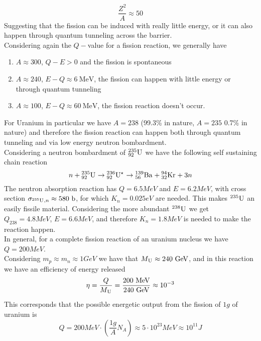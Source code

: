 \documentclass[../qm.tex]{subfiles}
\begin{document}
\begin{equation*}
	\frac{Z^2}{A}\approx50
\end{equation*}
Suggesting that the fission can be induced with really little energy, or it can also happen through quantum tunneling across the barrier.\\
Considering again the $Q-$value for a fission reaction, we generally have
\begin{enumerate}
\item $A\approx300$, $Q-E>0$ and the fission is spontaneous
\item $A\approx240$, $E-Q\approx 6\ \mathrm{MeV}$, the fission can happen with little energy or through quantum tunneling
\item $A\approx100$, $E-Q\approx60\ \mathrm{MeV}$, the fission reaction doesn't occur.
\end{enumerate}
For Uranium in particular we have $A=238$ (99.3\% in nature, $A=235$ 0.7\% in nature) and therefore the fission reaction can happen both through quantum tunneling and via low energy neutron bombardment.\\
Considering a neutron bombardment of $\nuc{U}{235}{92}$ we have the following self sustaining chain reaction
\begin{equation*}
	n+\nuc{U}{235}{92}\to\nuc{U^\star}{236}{92}\to\nuc{Ba}{139}{56}+\nuc{Kr}{94}{32}+3n
\end{equation*}
The neutron absorption reaction has $Q=6.5\unit{MeV}$ and $E=6.2\unit{MeV}$, with cross section $\sigma_{\nuc{U}{235}{},n}\approx580\unit{b}$, for which $K_n=0.025\unit{eV}$ are needed. This makes $\nuc{U}{235}{}$ an easily fissile material. Considering the more abundant $\nuc{U}{238}{}$ we get $Q_{238}=4.8\unit{MeV}$, $E=6.6\unit{MeV}$, and therefore $K_n=1.8\unit{MeV}$ is needed to make the reaction happen.\\
In general, for a complete fission reaction of an uranium nucleus we have $Q=200\unit{MeV}$.\\
Considering $m_p\approx m_n\approx1\unit{GeV}$ we have that $M_{\nuc{U}{}{}}\approx240\unit{GeV}$, and in this reaction we have an efficiency of energy released
\begin{equation*}
	\eta=\frac{Q}{M_{\nuc{U}{}{}}}=\frac{200\unit{MeV}}{240\unit{GeV}}\approx10^{-3}
\end{equation*}
This corresponds that the possible energetic output from the fission of $1\unit{g}$ of uranium is
\begin{equation*}
	Q=200\unit{MeV}\cdot\left( \frac{1\unit{g}}{A}N_A \right)\approx5\cdot10^{23}\unit{MeV}\approx10^{11}\unit{J}
\end{equation*}
\end{document}
